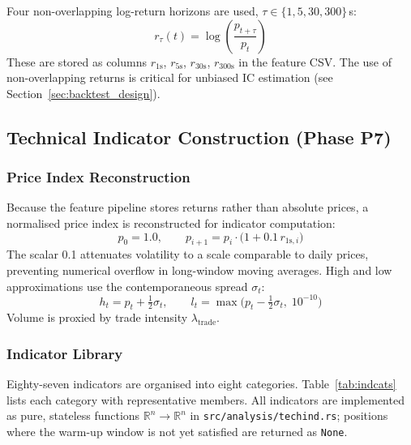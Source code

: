 \documentclass[12pt,a4paper]{article}
\theoremstyle{definition}
\theoremstyle{remark}
\newcommand{\code}[1]{\texttt{\small #1}}
\begin{document}
Four non-overlapping log-return horizons are used,
$\tau \in \{1, 5, 30, 300\}$\,s:
\begin{equation}
  r_\tau(t) = \log\!\left(\frac{p_{t+\tau}}{p_t}\right)
\label{eq:returns}
\end{equation}
These are stored as columns $r_{1\text{s}}$, $r_{5\text{s}}$,
$r_{30\text{s}}$, $r_{300\text{s}}$ in the feature CSV.
The use of non-overlapping returns is critical for unbiased IC
estimation (see Section~\ref{sec:backtest_design}).

\subsection{Technical Indicator Construction (Phase P7)}
\label{sec:techind_methods}

\subsubsection{Price Index Reconstruction}

Because the feature pipeline stores returns rather than absolute prices,
a normalised price index is reconstructed for indicator computation:
\begin{equation}
  p_0 = 1.0,\qquad
  p_{i+1} = p_i \cdot \bigl(1 + 0.1\,r_{1\mathrm{s},i}\bigr)
\label{eq:priceindex}
\end{equation}
The scalar 0.1 attenuates volatility to a scale comparable to daily
prices, preventing numerical overflow in long-window moving averages.
High and low approximations use the contemporaneous spread $\sigma_t$:
\begin{equation}
  h_t = p_t + \tfrac{1}{2}\sigma_t,\qquad
  l_t = \max\!\bigl(p_t - \tfrac{1}{2}\sigma_t,\;10^{-10}\bigr)
\end{equation}
Volume is proxied by trade intensity $\lambda_\mathrm{trade}$.

\subsubsection{Indicator Library}

Eighty-seven indicators are organised into eight categories.
Table~\ref{tab:indcats} lists each category with representative members.
All indicators are implemented as pure, stateless functions
$\mathbb{R}^n \to \mathbb{R}^n$ in \code{src/analysis/techind.rs};
positions where the warm-up window is not yet satisfied are returned
as \texttt{None}.
\end{document}
